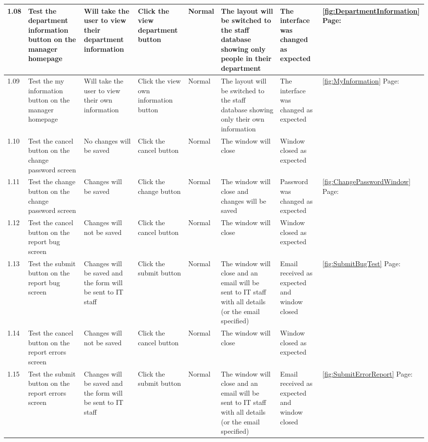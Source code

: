 \begin{landscape}
\begin{center}
\begin{longtable}{|p{1.5cm}|p{2cm}|p{2.5cm}|p{2cm}|p{2cm}|p{2cm}|p{3cm}|p{1.7cm}|}
1.08 & Test the department information button on the manager homepage & Will take the user to view their department information & Click the view department button & Normal & The layout will be switched to the staff database showing only people in their department & The interface was changed as expected&  \ref {fig:DepartmentInformation}  Page: \pageref{fig:DepartmentInformation}  \\ \hline

1.09 & Test the my information button on the manager homepage & Will take the user to view their own information & Click the view own information button& Normal  & The layout will be switched to the staff database showing only their own information &The interface was changed as expected&   \ref {fig:MyInformation} Page: \pageref{fig:MyInformation}\\ \hline
1.10 & Test the cancel button on the change password screen & No changes will be saved & Click the cancel button & Normal & The window will close & Window closed as expected&  \\ \hline
1.11 & Test the change button on the change password screen & Changes will be saved & Click the change button & Normal & The window will close and changes will be saved&Password was changed as expected& \ref{fig:ChangePasswordWindow} Page: \pageref{fig:ChangePasswordWindow}\\ \hline
1.12 & Test the cancel button on the report bug screen & Changes will not be saved & Click the cancel button & Normal & The window will close&Window closed as expected& \\ \hline
1.13 & Test the submit button on the report bug screen & Changes will be saved and the form will be sent to IT staff & Click the submit button& Normal  & The window will close and an email will be sent to IT staff with all details (or the email specified) &Email received as expected and window closed &  \ref {fig:SubmitBugTest}  Page: \pageref{fig:SubmitBugTest} \\ \hline
1.14 & Test the cancel button on the report errors screen & Changes will not be saved & Click the cancel button & Normal & The window will close& Window closed as expected& \\ \hline
1.15 & Test the submit button on the report errors screen & Changes will be saved and the form will be sent to IT staff & Click the submit button& Normal  & The window will close and an email will be sent to IT staff with all details (or the email specified) &Email received as expected and window closed & \ref {fig:SubmitErrorReport}  Page: \pageref{fig:SubmitErrorReport} \\ \hline

\end{longtable}
\end{center}
\end{landscape}
